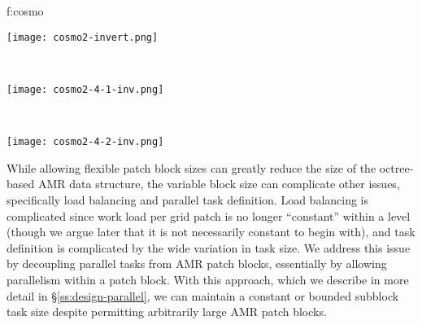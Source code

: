 \documentclass[10pt,twocolumn]{article}
\begin{document}
 {f:cosmo}{
\begin{minipage}{3.2in}
\begin{minipage}{1.0in}
\texttt{[image: cosmo2-invert.png]}
\end{minipage} \ 
\begin{minipage}{1.0in}
\texttt{[image: cosmo2-4-1-inv.png]}
\end{minipage} \ 
\begin{minipage}{1.0in}
\texttt{[image: cosmo2-4-2-inv.png]}
\end{minipage}
\end{minipage}
}


While allowing flexible patch block sizes can greatly reduce the size
of the octree-based AMR data structure, the variable block size can
complicate other issues, specifically load balancing and parallel task
definition.  Load balancing is complicated since work load per grid
patch is no longer ``constant'' within a level (though we argue later
that it is not necessarily constant to begin with), and task
definition is complicated by the wide variation in task size.  We
address this issue by decoupling parallel tasks from AMR patch blocks,
essentially by allowing parallelism within a patch block.  With this
approach, which we describe in more detail in
\S\ref{ss:design-parallel}, we can maintain a constant or bounded
subblock task size despite permitting arbitrarily large AMR patch
blocks.
\end{document}
